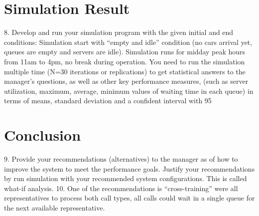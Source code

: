 \documentclass{article}
\begin{document}
\section{Simulation Result}
8. Develop and run your simulation program with the given initial and end conditions:  Simulation start with “empty and idle” condition (no cars arrival yet, queues are empty and servers are idle).  Simulation runs for midday peak hours from 11am to 4pm, no break during operation.  You need to run the simulation multiple time (N=30 iterations or replications) to get statistical answers to the manager’s questions, as well as other key performance measures, (such as server utilization, maximum, average, minimum values of waiting time in each queue) in terms of means, standard deviation and a confident interval with 95%


\section{Conclusion}
9. Provide your recommendations (alternatives) to the manager as of how to improve the system to meet the performance goals. Justify your recommendations by run simulation with your recommended system configurations. This is called what-if analysis. 10. One of the recommendations is “cross-training” were all representatives to process both call types, all calls could wait in a single queue for the next available representative. 
\end{document}
